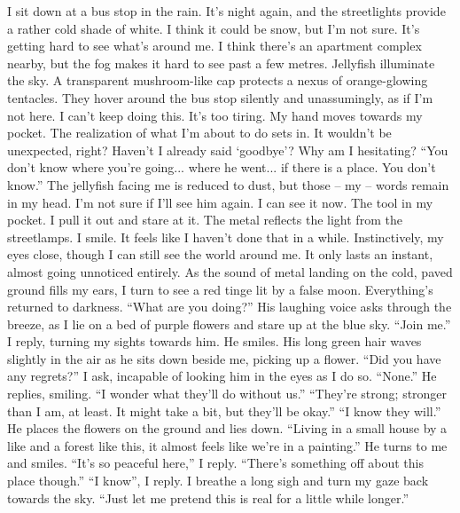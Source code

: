 \documentclass[a4paper, 12pt]{book}
\newcommand\tab[1][1cm]{\hspace*{#1}}
\begin{document}
\newline
\tab
I sit down at a bus stop in the rain. It’s night again, and the streetlights provide a rather cold shade of white. I think it could be snow, but I’m not sure. It’s getting hard to see what’s around me. I think there’s an apartment complex nearby, but the fog makes it hard to see past a few metres. Jellyfish illuminate the sky. A transparent mushroom-like cap protects a nexus of orange-glowing tentacles. They hover around the bus stop silently and unassumingly, as if I’m not here.
\newline
\tab
I can’t keep doing this. It’s too tiring. My hand moves towards my pocket. The realization of what I’m about to do sets in. It wouldn’t be unexpected, right? Haven’t I already said ‘goodbye’? Why am I hesitating? ``You don’t know where you’re going... where he went... if there is a place. You don’t know.'' The jellyfish facing me is reduced to dust, but those -- my -- words remain in my head. I’m not sure if I’ll see him again.
\newline
\tab
I can see it now. The tool in my pocket. I pull it out and stare at it. The metal reflects the light from the streetlamps. I smile. It feels like I haven’t done that in a while. Instinctively, my eyes close, though I can still see the world around me. It only lasts an instant, almost going unnoticed entirely. As the sound of metal landing on the cold, paved ground fills my ears, I turn to see a red tinge lit by a false moon. Everything’s returned to darkness.
\newline
\tab
``What are you doing?'' His laughing voice asks through the breeze, as I lie on a bed of purple flowers and stare up at the blue sky.
\newline
\tab
``Join me.'' I reply, turning my sights towards him. He smiles. His long green hair waves slightly in the air as he sits down beside me, picking up a flower. ``Did you have any regrets?'' I ask, incapable of looking him in the eyes as I do so.
\newline
\tab
``None.'' He replies, smiling. ``I wonder what they’ll do without us.''
\newline
\tab
``They’re strong; stronger than I am, at least. It might take a bit, but they’ll be okay.''
\newline
\tab
``I know they will.'' He places the flowers on the ground and lies down. ``Living in a small house by a like and a forest like this, it almost feels like we’re in a painting.'' He turns to me and smiles.
\newline
\tab
``It’s so peaceful here,'' I reply.
\newline
\tab
``There’s something off about this place though.''
\newline
\tab
``I know'', I reply. I breathe a long sigh and turn my gaze back towards the sky. ``Just let me pretend this is real for a little while longer.''
\end{document}
